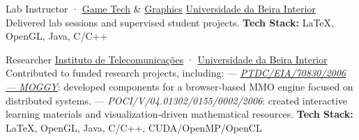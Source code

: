 \documentclass[
	a4paper,
]{fortysecondscv}
\begin{document}
\begin{cvtable}[3]
        {Lab Instructor · \href{https://www.di.ubi.pt/~agomes/tjv/}{Game Tech} \& \href{https://www.di.ubi.pt/~agomes/cg/}{Graphics}}
        {\href{https://www.ubi.pt/}{Universidade da Beira Interior}}
        {Delivered lab sessions and supervised student projects.
         \newline \textbf{Tech Stack:} 
         {\color{sklimegreen}LaTeX},
         {\color{skyellow}OpenGL},
         {\color{skyellow}Java},   
         {\color{skorange}C/C++}}

        {Researcher}
        {\href{https://www.it.pt/}{Instituto de Telecomunicações} · \href{https://www.ubi.pt/}{Universidade da Beira Interior}}
        {Contributed to funded research projects, including:
         \newline — \textit{\href{https://www.it.pt/Projects/Index/804}{PTDC/EIA/70830/2006 — MOGGY}}: developed components for a browser‑based MMO engine focused on distributed systems.
         \newline — \textit{POCI/V/04.01302/0155/0002/2006}: created interactive learning materials and visualization‑driven mathematical resources.
         \newline \textbf{Tech Stack:}
         {\color{sklimegreen}LaTeX},         
         {\color{skyellow}OpenGL},
         {\color{skyellow}Java}, 
         {\color{skorange}C/C++},         
         {\color{skorange}CUDA/OpenMP/OpenCL}}
    
\end{cvtable}

\newpage
\makebacksidebar
\end{document}
